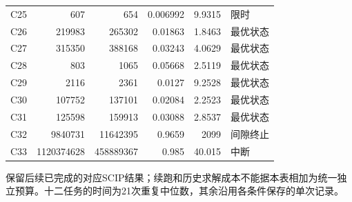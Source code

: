 {\begin{longtable}{lrrrrl}
C25 & 607 & 654 & 0.006992 & 9.9315 & 限时\\
C26 & 219983 & 265302 & 0.01863 & 1.8463 & 最优状态\\
C27 & 315350 & 388168 & 0.03243 & 4.0629 & 最优状态\\
C28 & 803 & 1065 & 0.05668 & 2.5119 & 最优状态\\
C29 & 2116 & 2361 & 0.0127 & 9.2528 & 最优状态\\
C30 & 107752 & 137101 & 0.02084 & 2.2523 & 最优状态\\
C31 & 125598 & 159913 & 0.03088 & 2.8537 & 最优状态\\
C32 & 9840731 & 11642395 & 0.9659 & 2099 & 间隙终止\\
C33 & 1120374628 & 458889367 & 0.985 & 40.015 & 中断\\
\end{longtable}
}
保留后续已完成的对应SCIP结果；续跑和历史求解成本不能据本表相加为统一独立预算。十二任务的时间为21次重复中位数，其余沿用各条件保存的单次记录。
